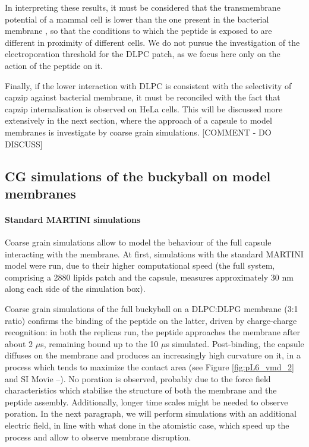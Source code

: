 In interpreting these results, it must be considered that the transmembrane potential of a mammal cell is lower than the one present in the bacterial membrane \citep{Yeaman2003,Wilson2011}, so that the conditions to which the peptide is exposed to are different in proximity of different cells. We do not pursue the investigation of the electroporation threshold for the DLPC patch, as we focus here only on the action of the peptide on it.

Finally, if the lower interaction with DLPC is consistent with the selectivity of capzip against bacterial membrane, it must be reconciled with the fact that capzip internalisation is observed on HeLa cells. This will be discussed more extensively in the next section, where the approach of a capsule to model membranes is investigate by coarse grain simulations. [COMMENT - DO DISCUSS]


\subsection{CG simulations of the buckyball on model membranes} \label{sec:results_lip_cg}

\paragraph{Standard MARTINI simulations} Coarse grain simulations allow to model the behaviour of the full capsule interacting with the membrane.
%
At first, simulations with the standard MARTINI model were run, due to their higher computational speed (the full system, comprising a 2880 lipids patch and the capsule, measures approximately 30 nm along each side of the simulation box).

Coarse grain simulations of the full buckyball on a DLPC:DLPG membrane (3:1 ratio) confirms the binding of the peptide on the latter, driven by charge-charge recognition: in both the replicas run, the peptide approaches the membrane after about 2 $\mu$s, remaining bound up to the 10 $\mu$s simulated.
%
Post-binding, the capsule diffuses on the membrane and produces an increasingly high curvature on it, in a process which tends to maximize the contact area (see Figure \ref{fig:pL6_vmd_2} and SI Movie --). No poration is observed, probably due to the force field characteristics which stabilise the structure of both the membrane and the peptide assembly. Additionally, longer time scales might be needed to observe poration. In the next paragraph, we will perform simulations with an additional electric field, in line with what done in the atomistic case, which speed up the process and allow to observe membrane disruption.

